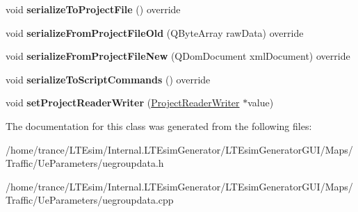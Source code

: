 \begin{DoxyCompactItemize}
\item 
void {\bfseries serialize\+To\+Project\+File} () override\hypertarget{class_u_egroup_data_abcde0b02372ff0059862910652cf6a3a}{}\label{class_u_egroup_data_abcde0b02372ff0059862910652cf6a3a}

\item 
void {\bfseries serialize\+From\+Project\+File\+Old} (Q\+Byte\+Array raw\+Data) override\hypertarget{class_u_egroup_data_a00fc446c808dcefadcab4e440c6dc51b}{}\label{class_u_egroup_data_a00fc446c808dcefadcab4e440c6dc51b}

\item 
void {\bfseries serialize\+From\+Project\+File\+New} (Q\+Dom\+Document xml\+Document) override\hypertarget{class_u_egroup_data_a2a5cbe14e867c740b700d32582c2f7d1}{}\label{class_u_egroup_data_a2a5cbe14e867c740b700d32582c2f7d1}

\item 
void {\bfseries serialize\+To\+Script\+Commands} () override\hypertarget{class_u_egroup_data_a6e9f3d1b098fe716c74255db18c0a278}{}\label{class_u_egroup_data_a6e9f3d1b098fe716c74255db18c0a278}

\item 
void {\bfseries set\+Project\+Reader\+Writer} (\hyperlink{class_project_reader_writer}{Project\+Reader\+Writer} $\ast$value)\hypertarget{class_u_egroup_data_ada53e280d570ae54b919620916448184}{}\label{class_u_egroup_data_ada53e280d570ae54b919620916448184}

\end{DoxyCompactItemize}


The documentation for this class was generated from the following files\+:\begin{DoxyCompactItemize}
\item 
/home/trance/\+L\+T\+Esim/\+Internal.\+L\+T\+Esim\+Generator/\+L\+T\+Esim\+Generator\+G\+U\+I/\+Maps/\+Traffic/\+Ue\+Parameters/uegroupdata.\+h\item 
/home/trance/\+L\+T\+Esim/\+Internal.\+L\+T\+Esim\+Generator/\+L\+T\+Esim\+Generator\+G\+U\+I/\+Maps/\+Traffic/\+Ue\+Parameters/uegroupdata.\+cpp\end{DoxyCompactItemize}
